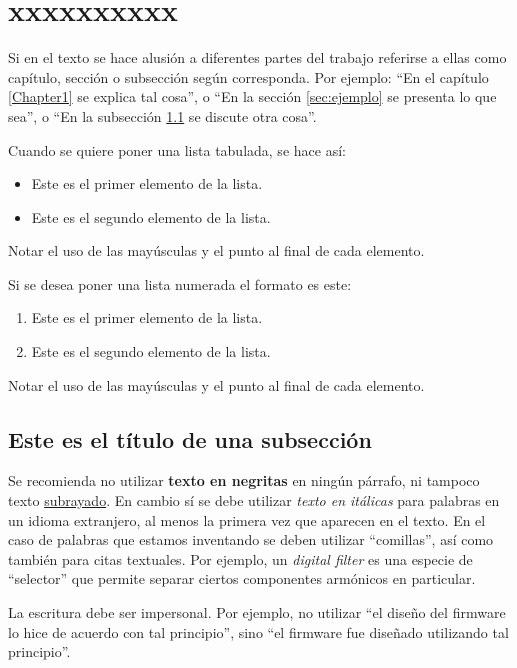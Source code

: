 \section{xxxxxxxxxx}


Si en el texto se hace alusión a diferentes partes del trabajo referirse a ellas como capítulo, sección o subsección según corresponda. Por ejemplo: ``En el capítulo \ref{Chapter1} se explica tal cosa'', o ``En la sección \ref{sec:ejemplo} se presenta lo que sea'', o ``En la subsección \ref{subsec:ejemplo} se discute otra cosa''.

Cuando se quiere poner una lista tabulada, se hace así:

\begin{itemize}
	\item Este es el primer elemento de la lista.
	\item Este es el segundo elemento de la lista.
\end{itemize}

Notar el uso de las mayúsculas y el punto al final de cada elemento.

Si se desea poner una lista numerada el formato es este:

\begin{enumerate}
	\item Este es el primer elemento de la lista.
	\item Este es el segundo elemento de la lista.
\end{enumerate}

Notar el uso de las mayúsculas y el punto al final de cada elemento.

\subsection{Este es el título de una subsección}
\label{subsec:ejemplo}

Se recomienda no utilizar \textbf{texto en negritas} en ningún párrafo, ni tampoco texto \underline{subrayado}. En cambio sí se debe utilizar \textit{texto en itálicas} para palabras en un idioma extranjero, al menos la primera vez que aparecen en el texto. En el caso de palabras que estamos inventando se deben utilizar ``comillas'', así como también para citas textuales. Por ejemplo, un \textit{digital filter} es una especie de ``selector'' que permite separar ciertos componentes armónicos en particular.

La escritura debe ser impersonal. Por ejemplo, no utilizar ``el diseño del firmware lo hice de acuerdo con tal principio'', sino ``el firmware fue diseñado utilizando tal principio''. 

